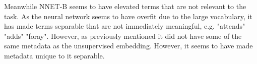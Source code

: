 Meanwhile NNET-B seems to have elevated terms that are not relevant to the task. As the neural network seems to have overfit due to the large vocabulary, it has made terms separable that are not immediately meaningful, e.g. "attends" "adds" "foray". However, as previously mentioned it did  not have some of the same metadata as the unsupervised embedding. However, it seems to have made metadata unique to it separable. 


